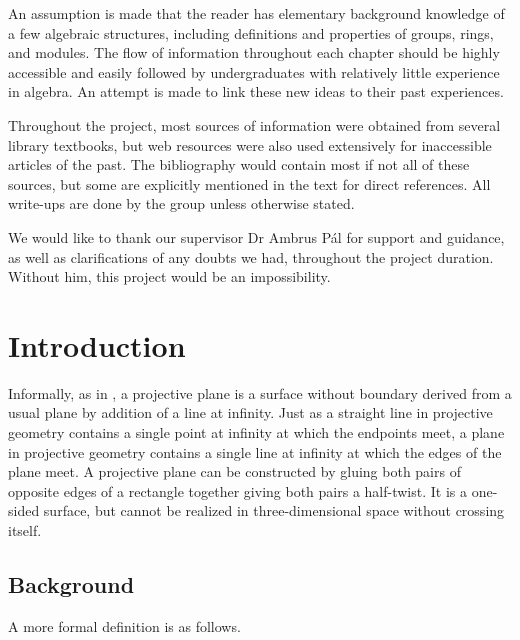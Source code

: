 \documentclass{report}
\theoremstyle{definition}\newtheorem*{definition}{Definition}
\theoremstyle{definition}\newtheorem*{example}{Example}
\theoremstyle{remark}\newtheorem*{remark}{Remark}
\begin{document}
An assumption is made that the reader has elementary background knowledge of a few algebraic structures, including definitions and properties of groups, rings, and modules. The flow of information throughout each chapter should be highly accessible and easily followed by undergraduates with relatively little experience in algebra. An attempt is made to link these new ideas to their past experiences.

Throughout the project, most sources of information were obtained from several library textbooks, but web resources were also used extensively for inaccessible articles of the past. The bibliography would contain most if not all of these sources, but some are explicitly mentioned in the text for direct references. All write-ups are done by the group unless otherwise stated.

We would like to thank our supervisor Dr Ambrus Pál for support and guidance, as well as clarifications of any doubts we had, throughout the project duration. Without him, this project would be an impossibility.

\chapter{Introduction}

Informally, as in \cite{projectiveplane}, a projective plane is a surface without boundary derived from a usual plane by addition of a line at infinity. Just as a straight line in projective geometry contains a single point at infinity at which the endpoints meet, a plane in projective geometry contains a single line at infinity at which the edges of the plane meet. A projective plane can be constructed by gluing both pairs of opposite edges of a rectangle together giving both pairs a half-twist. It is a one-sided surface, but cannot be realized in three-dimensional space without crossing itself.

\section{Background}

A more formal definition is as follows.
\end{document}
